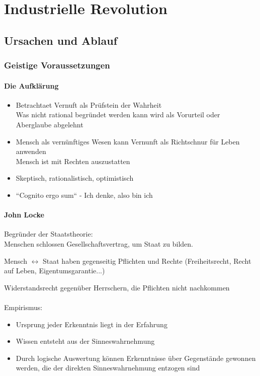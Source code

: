 \documentclass{report}
\begin{document}
\chapter{Industrielle Revolution}
\section{Ursachen und Ablauf}
\subsection{Geistige Voraussetzungen}
\subsubsection{Die Aufklärung}
\begin{itemize}
	\item Betrachtaet Vernuft als Prüfstein der Wahrheit\\
		\arrow Was nicht rational begründet werden kann wird als Vorurteil oder Aberglaube abgelehnt
	\item Mensch als vernünftiges Wesen kann Vernunft als Richtschnur für Leben anwenden\\
		\arrow Mensch ist mit Rechten auszustatten
	\item Skeptisch, rationalistisch, optimistisch
	\item ``Cognito ergo sum`` - Ich denke, also bin ich
\end{itemize}

\subsubsection{John Locke}
Begründer der Staatstheorie:\\
Menschen schlossen Gesellschaftsvertrag, um Staat zu bilden.

Mensch $\leftrightarrow$ Staat haben gegenseitig Pflichten und Rechte (Freiheitsrecht, Recht auf Leben, Eigentumsgarantie...)

Widerstandsrecht gegenüber Herrschern, die Pflichten nicht nachkommen\\\\
Empirismus:
\begin{itemize}
	\item Ursprung jeder Erkenntnis liegt in der Erfahrung
	\item Wissen entsteht aus der Sinneswahrnehmung
	\item Durch logische Auswertung können Erkenntnisse über Gegenstände gewonnen werden, die der direkten Sinneswahrnehmung entzogen sind
\end{itemize}
\end{document}
